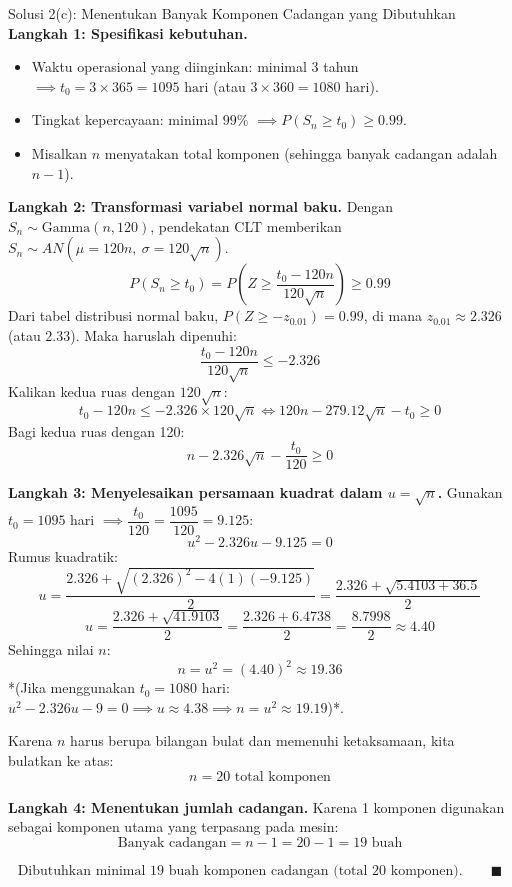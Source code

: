 \documentclass[10pt,twoside]{article}
\begin{document}
\begin{solbox}{Solusi 2(c): Menentukan Banyak Komponen Cadangan yang Dibutuhkan}
\textbf{Langkah 1: Spesifikasi kebutuhan.}
\begin{itemize}
  \item Waktu operasional yang diinginkan: minimal 3 tahun $\implies t_0 = 3 \times 365 = 1095 \text{ hari}$ (atau $3 \times 360 = 1080 \text{ hari}$).
  \item Tingkat kepercayaan: minimal $99\%$ $\implies P(S_n \ge t_0) \ge 0.99$.
  \item Misalkan $n$ menyatakan total komponen (sehingga banyak cadangan adalah $n - 1$).
\end{itemize}

\textbf{Langkah 2: Transformasi variabel normal baku.}
Dengan $S_n \sim \text{Gamma}(n, 120)$, pendekatan CLT memberikan $S_n \sim AN(\mu = 120n, \ \sigma = 120\sqrt{n})$.
\[
P(S_n \ge t_0) = P\left(Z \ge \frac{t_0 - 120n}{120\sqrt{n}}\right) \ge 0.99
\]
Dari tabel distribusi normal baku, $P(Z \ge -z_{0.01}) = 0.99$, di mana $z_{0.01} \approx 2.326$ (atau $2.33$). Maka haruslah dipenuhi:
\[
\frac{t_0 - 120n}{120\sqrt{n}} \le -2.326
\]
Kalikan kedua ruas dengan $120\sqrt{n}$:
\[
t_0 - 120n \le -2.326 \times 120 \sqrt{n} \iff 120n - 279.12\sqrt{n} - t_0 \ge 0
\]
Bagi kedua ruas dengan 120:
\[
n - 2.326\sqrt{n} - \frac{t_0}{120} \ge 0
\]

\textbf{Langkah 3: Menyelesaikan persamaan kuadrat dalam $u = \sqrt{n}$.}
Gunakan $t_0 = 1095$ hari $\implies \dfrac{t_0}{120} = \dfrac{1095}{120} = 9.125$:
\[
u^2 - 2.326u - 9.125 = 0
\]
Rumus kuadratik:
\[
u = \frac{2.326 + \sqrt{(2.326)^2 - 4(1)(-9.125)}}{2} = \frac{2.326 + \sqrt{5.4103 + 36.5}}{2}
\]
\[
u = \frac{2.326 + \sqrt{41.9103}}{2} = \frac{2.326 + 6.4738}{2} = \frac{8.7998}{2} \approx 4.40
\]
Sehingga nilai $n$:
\[
n = u^2 = (4.40)^2 \approx 19.36
\]
*(Jika menggunakan $t_0 = 1080$ hari: $u^2 - 2.326u - 9 = 0 \implies u \approx 4.38 \implies n = u^2 \approx 19.19$)*.

Karena $n$ harus berupa bilangan bulat dan memenuhi ketaksamaan, kita bulatkan ke atas:
\[
n = 20 \text{ total komponen}
\]

\textbf{Langkah 4: Menentukan jumlah cadangan.}
Karena 1 komponen digunakan sebagai komponen utama yang terpasang pada mesin:
\[
\text{Banyak cadangan} = n - 1 = 20 - 1 = 19 \text{ buah}
\]

\[
\boxed{\text{Dibutuhkan minimal } 19 \text{ buah komponen cadangan (total 20 komponen).}} \qquad \blacksquare
\]
\end{solbox}
\end{document}
